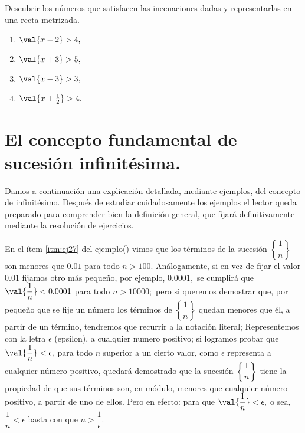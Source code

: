 \begin{ejercicios}[]

Descubrir los números que satisfacen las inecuaciones dadas y representarlas
en una recta metrizada.
\begin{enumerate}
\item $\val{x-2}>4,$ 
\item $\val{x+3}>5,$
\item $\val{x-3}>3,$
\item $\val{x+\frac{1}{2}}>4.$ 
\end{enumerate}
\end{ejercicios}

\section{El concepto fundamental de sucesión infinitésima.}

\intro 

Damos a continuación una explicación detallada, mediante ejemplos,
del concepto de infinitésimo. Después de estudiar cuidadosamente los
ejemplos el lector queda preparado para comprender bien la definición
general, que fijará definitivamente mediante la resolución de ejercicios.

\begin{ejemplo}\label{ej:ejem2.1}

En el ítem \ref{itm:ej27} del ejemplo() vimos que
los términos de la sucesión $\left\{ \dfrac{1}{n}\right\} $ son menores
que $0.01$ para todo $n>100.$ Análogamente, si en vez de fijar el
valor $0.01$ fijamos otro más pequeño, por ejemplo, $0.0001,$ se
cumplirá que $\val{\dfrac{1}{n}}<0.0001$ para todo $n>10000;$ pero
si queremos demostrar que, por pequeño que se fije un número los términos
de $\left\{ \dfrac{1}{n}\right\} $ quedan menores que él, a partir
de un término, tendremos que recurrir a la notación literal; Representemos
con la letra $\epsilon$ (epsilon), a cualquier numero positivo; si
logramos probar que $\val{\dfrac{1}{n}}<\epsilon,$ para todo $n$
superior a un cierto valor, como $\epsilon$ representa a cualquier
número positivo, quedará demostrado que la sucesión $\left\{ \dfrac{1}{n}\right\} $
tiene la propiedad de que sus términos son, en módulo, menores que
cualquier número positivo, a partir de uno de ellos. Pero en efecto:
para que $\val{\dfrac{1}{n}}<\epsilon,$ o sea, $\dfrac{1}{n}<\epsilon$
basta con que $n>\dfrac{1}{\epsilon}.$\linebreak{}
\end{ejemplo}

